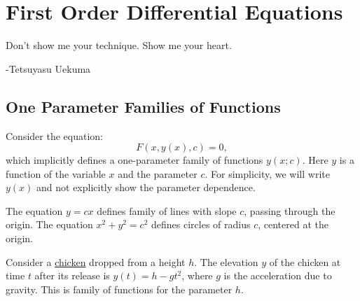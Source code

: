 \flushbottom






\chapter{First Order Differential Equations}
\label{chapter_foo}

Don't show me your technique.  Show me your heart.

\begin{flushright}
  -Tetsuyasu Uekuma
\end{flushright}








\section{One Parameter Families of Functions}



Consider the equation:
\begin{equation}
  \label{equation F(x,y(x),c)=0}
  F(x, y(x), c) = 0,
\end{equation}
which implicitly defines a one-parameter family of functions $y(x;c)$.
Here $y$ is a function of the variable $x$ and the parameter $c$.
For simplicity, we will write $y(x)$ and not explicitly show the 
parameter dependence.


\begin{Example}
  The equation $y = c x$ defines family of lines with slope $c$, passing
  through the origin.  The equation $x^2 + y^2 = c^2$ defines circles
  of radius $c$, centered at the origin.

  Consider a 
  \hyperref[chapter spherical chicken]{chicken}
  dropped from 
  a height $h$.  The elevation $y$ of the chicken at time $t$ after 
  its release is $y(t) = h - g t^2$, where $g$ is the acceleration due 
  to gravity.  This is family of functions for the parameter $h$.
\end{Example}


